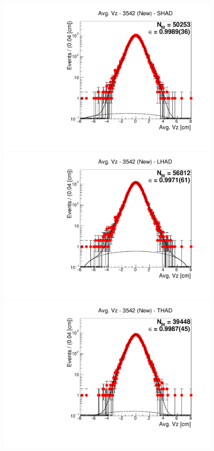 \begin{figure}[H]
\centering
\includegraphics[scale=0.25]{figures/plots/nonDDbar_fit_results/3650_new/fit_new_3542_data_SHAD.pdf}
\hspace{-0.5cm}
\includegraphics[scale=0.25]{figures/plots/nonDDbar_fit_results/3650_new/fit_new_3542_data_LHAD.pdf}
\hspace{-0.5cm}
\includegraphics[scale=0.25]{figures/plots/nonDDbar_fit_results/3650_new/fit_new_3542_data_THAD.pdf}

\end{figure}
